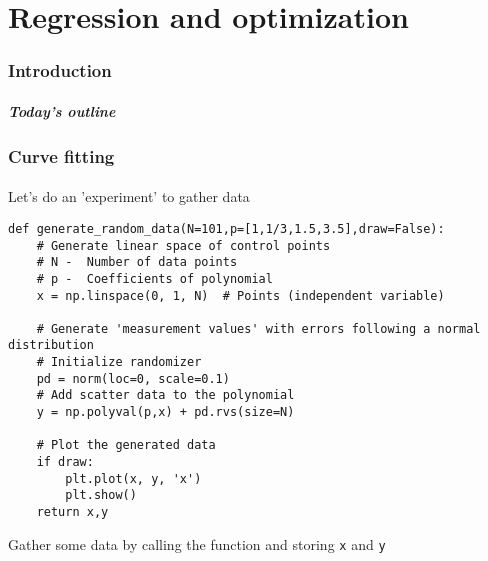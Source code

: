 \part{Regression and optimization}
\section{Introduction}
\subsection*{}
\begin{frame}[label=contents_opt]
  \frametitle{Today's outline}
\end{frame}


\section{Curve fitting}
\subsection*{}
\begin{frame}[fragile,label={slidedatacreate}]{Let's do an 'experiment' to gather data}
    \begin{lstlisting}
def generate_random_data(N=101,p=[1,1/3,1.5,3.5],draw=False):
    # Generate linear space of control points
    # N -  Number of data points
    # p -  Coefficients of polynomial
    x = np.linspace(0, 1, N)  # Points (independent variable)

    # Generate 'measurement values' with errors following a normal distribution
    # Initialize randomizer
    pd = norm(loc=0, scale=0.1)
    # Add scatter data to the polynomial
    y = np.polyval(p,x) + pd.rvs(size=N)

    # Plot the generated data
    if draw:
        plt.plot(x, y, 'x')
        plt.show()      
    return x,y   
    \end{lstlisting}
    Gather some data by calling the function and storing \lstinline|x| and \lstinline|y|
\end{frame}

